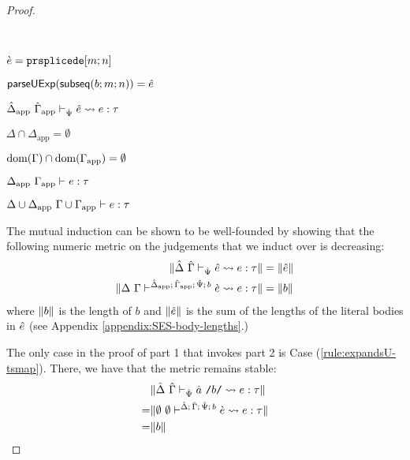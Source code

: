 \begin{proof}
\begin{byCases}
\item[\text{(\ref{rule:cvalidE-U-splicede})}] ~
\begin{pfsteps*}
  \item $\grave{e}=\texttt{prsplicede}[m; n]$ 
  \item $\mathsf{parseUExp}(\mathsf{subseq}(b; m; n))={\hat e}$ 
  \item $\hat{\Delta}_\text{app}~\hat{\Gamma}_\text{app} \vdash_{\hat{\Psi}} {\hat e} \leadsto e : \tau$  
  \item $\Delta \cap \Delta_\text{app}=\emptyset$  
  \item $\text{dom}(\Gamma) \cap \text{dom}(\Gamma_\text{app})=\emptyset$  
  \item $\Delta_\text{app}~\Gamma_\text{app} \vdash e : \tau$  
  \item ${\Delta}\cup{\Delta_\text{app}}~{\Gamma}\cup{\Gamma_\text{app}} \vdash e : \tau$ 
\end{pfsteps*}
\resetpfcounter
\end{byCases}

The mutual induction can be shown to be well-founded by showing that the following numeric metric on the judgements that we induct over is decreasing:
\begin{align*}
\Vert \hat{\Delta}~\hat{\Gamma} \vdash_{\hat{\Psi}} {\hat e} \leadsto e : \tau \Vert & = \Vert {\hat e} \Vert\\
\Vert \Delta~\Gamma\vdash^{\hat{\Delta}_\text{app};\,\hat{\Gamma}_\text{app};\,\hat{\Psi};\,b} \grave{e} \leadsto e : \tau \Vert & = \Vert b \Vert
\end{align*}
where $\Vert b \Vert$ is the length of $b$ and $\Vert {\hat e} \Vert$ is the sum of the lengths of the literal bodies in ${\hat e}$ (see Appendix \ref{appendix:SES-body-lengths}.)

The only case in the proof of part 1 that invokes part 2 is Case (\ref{rule:expandsU-tsmap}). There, we have that the metric remains stable: \begin{align*}
 & \Vert \hat{\Delta}~\hat{\Gamma} \vdash_{\hat{\Psi}} \hat{a}~\texttt{/}b\texttt{/} \leadsto e : \tau \Vert\\
=& \Vert \emptyset~\emptyset\vdash^{\hat{\Delta};\,\hat{\Gamma};\,\hat{\Psi};\,b} \grave{e} \leadsto e : \tau \Vert\\
=&\Vert b \Vert\end{align*}


\end{proof}
